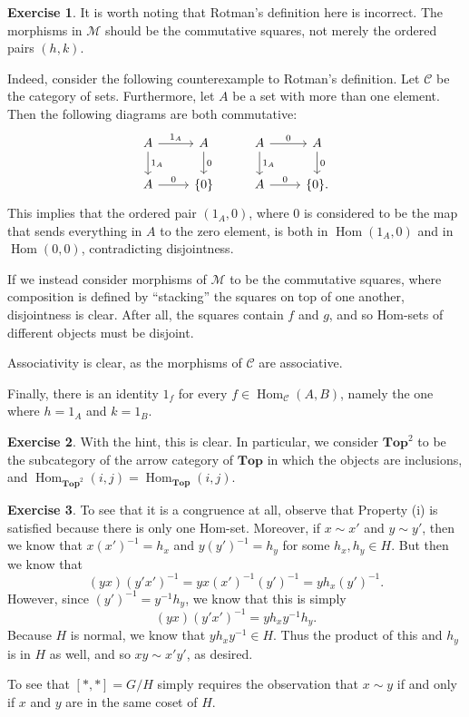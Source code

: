 \documentclass{article}
\theoremstyle{definition}
\newtheorem{intex}{Exercise}[section]
\newenvironment{exercise}{\begin{intex}\label{\theintex}}{\end{intex}}
\DeclareMathOperator\Hom{Hom}
\newcommand*\Cat[1]{\textbf{#1}}
\newcommand*\Top{\Cat{Top}}
\begin{document}
\begin{exercise}
It is worth noting that Rotman's definition here is incorrect. The morphisms in $\mathcal M$ should be the commutative squares, not merely the ordered pairs $(h,k)$. 

Indeed, consider the following counterexample to Rotman's definition. Let $\mathcal C$ be the category of sets. Furthermore, let $A$ be a set with more than one element. Then the following diagrams are both commutative: 
\[\begin{tikzcd}
A\arrow[r,"1_A"]\arrow[d,"1_A"]&A\arrow[d,"0"]&A\arrow[r,"0"]\arrow[d,"1_A"]&A\arrow[d,"0"]\\ 
A\arrow[r,"0"]&\{0\}&A\arrow[r,"0"]&\{0\}.
\end{tikzcd}\]
This implies that the ordered pair $(1_A,0)$, where $0$ is considered to be the map that sends everything in $A$ to the zero element, is both in $\Hom(1_A,0)$ and in $\Hom(0,0)$, contradicting disjointness. 

If we instead consider morphisms of $\mathcal M$ to be the commutative squares, where composition is defined by ``stacking'' the squares on top of one another, disjointness is clear. After all, the squares contain $f$ and $g$, and so Hom-sets of different objects must be disjoint. 

Associativity is clear, as the morphisms of $\mathcal C$ are associative.

Finally, there is an identity $1_f$ for every $f\in\Hom_{\mathcal C}(A,B)$, namely the one where $h=1_A$ and $k=1_B$. 
\end{exercise} 

\begin{exercise}
With the hint, this is clear. In particular, we consider $\Top^2$ to be the subcategory of the arrow category of $\Top$ in which the objects are inclusions, and $\Hom_{\Top^2}(i,j)=\Hom_\Top(i,j)$. 
\end{exercise} 

\begin{exercise}
To see that it is a congruence at all, observe that Property (i) is satisfied because there is only one Hom-set. Moreover, if $x\sim x'$ and $y\sim y'$, then we know that $x(x')^{-1}=h_x$ and $y(y')^{-1}=h_y$ for some $h_x,h_y\in H$. But then we know that \[(yx)(y'x')^{-1}=yx(x')^{-1}(y')^{-1}=yh_x(y')^{-1}.\] However, since $(y')^{-1}=y^{-1}h_y$, we know that this is simply \[(yx)(y'x')^{-1}=yh_xy^{-1}h_y.\] Because $H$ is normal, we know that $yh_xy^{-1}\in H$. Thus the product of this and $h_y$ is in $H$ as well, and so $xy\sim x'y'$, as desired. 

To see that $[*,*]=G/H$ simply requires the observation that $x\sim y$ if and only if $x$ and $y$ are in the same coset of $H$. 
\end{exercise} 
\end{document}
